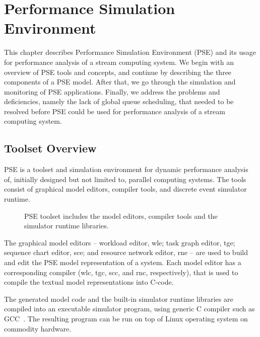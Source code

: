 \chapter{Performance Simulation Environment}
\label{chapter:performance-simulation-environment}

This chapter describes Performance Simulation Environment (PSE) and its usage for performance analysis of a stream computing system. We begin with an overview of PSE tools and concepts, and continue by describing the three components of a PSE model. After that, we go through the simulation and monitoring of PSE applications. Finally, we address the problems and deficiencies, namely the lack of global queue scheduling, that needed to be resolved before PSE could be used for performance analysis of a stream computing system.

\section{Toolset Overview}
\label{sec:toolset-overview}

PSE is a toolset and simulation environment for dynamic performance analysis of, initially designed but not limited to, parallel computing systems. The tools consist of graphical model editors, compiler tools, and discrete event simulator runtime.

\begin{figure}[]
  \begin{center}
    \caption{PSE toolset includes the model editors, compiler tools and the simulator runtime libraries.}
    \label{fig:pse-toolset}
  \end{center}
\end{figure}

The graphical model editors -- workload editor, wle; task graph editor, tge; sequence chart editor, sce; and resource network editor, rne -- are used to build and edit the PSE model representation of a system. Each model editor has a corresponding compiler (wlc, tgc, scc, and rnc, respectively), that is used to compile the textual model representations into C-code.

The generated model code and the built-in simulator runtime libraries are compiled into an executable simulator program, using generic C compiler such as GCC~\cite{stallman:2009:gcc}. The resulting program can be run on top of Linux operating system on commodity hardware.

